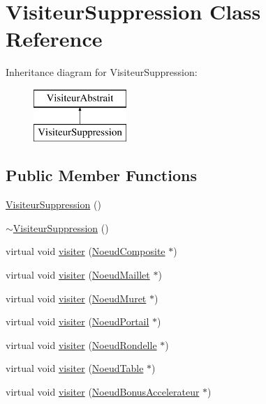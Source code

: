 \hypertarget{class_visiteur_suppression}{}\section{Visiteur\+Suppression Class Reference}
\label{class_visiteur_suppression}
Inheritance diagram for Visiteur\+Suppression\+:\begin{figure}[H]
\begin{center}
\leavevmode
\includegraphics[height=2.000000cm]{class_visiteur_suppression}
\end{center}
\end{figure}
\subsection*{Public Member Functions}
\begin{DoxyCompactItemize}
\item 
\hyperlink{group__inf2990_ga77790339ddd453ed30dffccef8934373}{Visiteur\+Suppression} ()
\item 
\hyperlink{group__inf2990_ga609bdf7e42165bdfa8d4c4d816c2b71d}{$\sim$\+Visiteur\+Suppression} ()
\item 
virtual void \hyperlink{group__inf2990_gae0fb11ee5dcb5859fd4e163b685b637f}{visiter} (\hyperlink{class_noeud_composite}{Noeud\+Composite} $\ast$)
\item 
virtual void \hyperlink{group__inf2990_ga16f8a5baaf97984aa643548b3d7fdb77}{visiter} (\hyperlink{class_noeud_maillet}{Noeud\+Maillet} $\ast$)
\item 
virtual void \hyperlink{group__inf2990_ga9c2fa9629828ea966b7f8823f3fc27f1}{visiter} (\hyperlink{class_noeud_muret}{Noeud\+Muret} $\ast$)
\item 
virtual void \hyperlink{group__inf2990_ga44d65975bdbc7e3d83171694ad8bd49f}{visiter} (\hyperlink{class_noeud_portail}{Noeud\+Portail} $\ast$)
\item 
virtual void \hyperlink{group__inf2990_ga583a45169e345e2262f8a572c32e7822}{visiter} (\hyperlink{class_noeud_rondelle}{Noeud\+Rondelle} $\ast$)
\item 
virtual void \hyperlink{group__inf2990_gae84d0ab8c7eb74a325d3da3a3629d0b3}{visiter} (\hyperlink{class_noeud_table}{Noeud\+Table} $\ast$)
\item 
virtual void \hyperlink{group__inf2990_ga16d27e0e09fbdfde27639965c71c415c}{visiter} (\hyperlink{class_noeud_bonus_accelerateur}{Noeud\+Bonus\+Accelerateur} $\ast$)
\end{DoxyCompactItemize}

